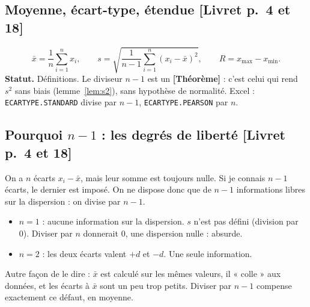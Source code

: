 \documentclass[11pt,a4paper]{article}
\theoremstyle{tq}
\theoremstyle{remark}
\newcommand{\thm}{\textcolor{vertTQ}{\textbf{[Théorème]}}}
\newcommand{\liv}[1]{\textcolor{uimmblue}{\small[Livret p.~#1]}}
\begin{document}
\subsection{Moyenne, écart-type, étendue \liv{4 et 18}}
\[
\bar x=\frac1n\sum_{i=1}^nx_i,\qquad s=\sqrt{\frac{1}{n-1}\sum_{i=1}^n(x_i-\bar x)^2},\qquad R=x_{\max}-x_{\min}.
\]
\textbf{Statut.} Définitions. Le diviseur $n-1$ est un \thm{} : c'est celui qui rend $s^2$ sans biais (lemme~\ref{lem:s2}), sans hypothèse de normalité. Excel : \texttt{ECARTYPE.STANDARD} divise par $n-1$, \texttt{ECARTYPE.PEARSON} par $n$.

\subsection{Pourquoi $n-1$ : les degrés de liberté \liv{4 et 18}}
\begin{cle}
On a $n$ écarts $x_i-\bar x$, mais leur somme est toujours nulle. Si je connais $n-1$ écarts, le dernier est imposé. On ne dispose donc que de $n-1$ informations libres sur la dispersion : on divise par $n-1$.
\begin{itemize}[nosep,leftmargin=1.2em]
\item $n=1$ : aucune information sur la dispersion. $s$ n'est pas défini (division par 0). Diviser par $n$ donnerait $0$, une dispersion nulle : absurde.
\item $n=2$ : les deux écarts valent $+d$ et $-d$. Une seule information.
\end{itemize}
Autre façon de le dire : $\bar x$ est calculé sur les mêmes valeurs, il « colle » aux données, et les écarts à $\bar x$ sont un peu trop petits. Diviser par $n-1$ compense exactement ce défaut, en moyenne.
\end{cle}
\end{document}
